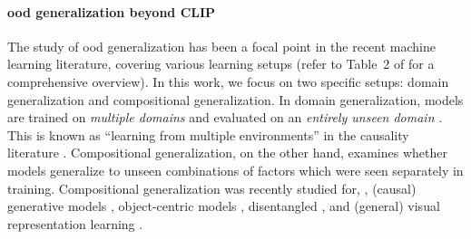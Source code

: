 \paragraph{\acrshort{ood} generalization beyond CLIP}
The study of \acrshort{ood} generalization has been a focal point in the recent machine learning literature, covering various learning setups (refer to Table~2 of \citet{gulrajani2021in} for a comprehensive overview). In this work, we focus on two specific setups: domain generalization and compositional generalization.
In domain generalization, models are trained on \emph{multiple domains} and evaluated on an \emph{entirely unseen domain} \citep{blanchard2011generalizing,muandet2013domain,gulrajani2021in}. This is known as ``learning from multiple environments'' in the causality literature \citep{peters2016causal,arjovsky2019invariant,arjovsky2019out,richens2024robust}.
Compositional generalization, on the other hand, examines whether models generalize to unseen combinations of factors which were seen separately in training.
Compositional generalization was recently studied for, \eg, (causal) generative models \citep{atzmon2020causal,okawa2023compositional,wiedemer2023compositional}, object-centric models \citep{wiedemer2024provable}, disentangled \citep{xu2022compositional}, and (general) visual representation learning \citep{misra2017red,schott2022visual,saranrittichai2022overcoming}.

